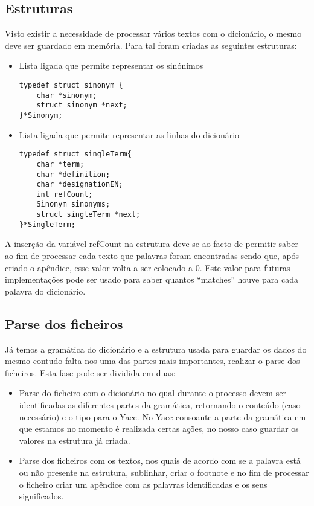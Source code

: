 \documentclass{llncs}
\begin{document}
\subsection{Estruturas}
Visto existir a necessidade de processar vários textos com o dicionário, o mesmo deve ser guardado em memória. Para tal foram criadas as seguintes estruturas:
\renewcommand{\labelitemi}{$\bullet$}
\begin{itemize}
\item Lista ligada que permite representar os sinónimos
\begin{lstlisting}
typedef struct sinonym {
    char *sinonym;
    struct sinonym *next;
}*Sinonym;
\end{lstlisting}
\item Lista ligada que permite representar as linhas do dicionário
\begin{lstlisting}
typedef struct singleTerm{
    char *term;
    char *definition;
    char *designationEN;
    int refCount;
    Sinonym sinonyms;
    struct singleTerm *next;
}*SingleTerm;
\end{lstlisting}
\end{itemize}
A inserção da variável refCount na estrutura deve-se ao facto de permitir saber ao fim de processar cada texto que palavras foram encontradas sendo que, após criado o apêndice, esse valor volta a ser colocado a 0. Este valor para futuras implementações pode ser usado para saber quantos ``matches'' houve para cada palavra do dicionário.

\subsection{Parse dos ficheiros}
Já temos a gramática do dicionário e a estrutura usada para guardar os dados do mesmo contudo falta-nos uma das partes mais importantes, realizar o parse dos ficheiros. Esta fase pode ser dividida em duas:
\begin{itemize}
\item Parse do ficheiro com o dicionário no qual durante o processo devem ser identificadas as diferentes partes da gramática, retornando o conteúdo (caso necessário) e o tipo para o Yacc. No Yacc consoante a parte da gramática em que estamos no momento é realizada certas ações, no nosso caso guardar os valores na estrutura já criada.
\item Parse dos ficheiros com os textos, nos quais de acordo com se a palavra está ou não presente na estrutura, sublinhar, criar o footnote e no fim de processar o ficheiro criar um apêndice com as palavras identificadas e os seus significados.
\end{itemize}
\end{document}
